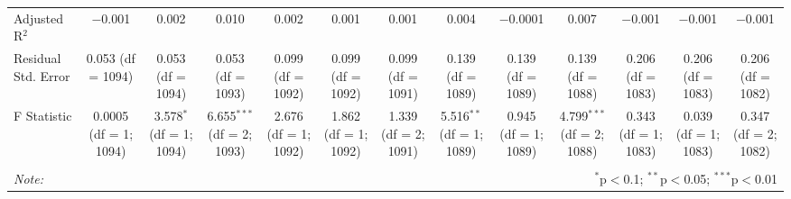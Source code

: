 \begin{table}[!htbp]
\begin{tabular}{@{\extracolsep{5pt}}lcccccccccccc}
Adjusted R$^{2}$ & $-$0.001 & 0.002 & 0.010 & 0.002 & 0.001 & 0.001 & 0.004 & $-$0.0001 & 0.007 & $-$0.001 & $-$0.001 & $-$0.001 \\ 
Residual Std. Error & 0.053 (df = 1094) & 0.053 (df = 1094) & 0.053 (df = 1093) & 0.099 (df = 1092) & 0.099 (df = 1092) & 0.099 (df = 1091) & 0.139 (df = 1089) & 0.139 (df = 1089) & 0.139 (df = 1088) & 0.206 (df = 1083) & 0.206 (df = 1083) & 0.206 (df = 1082) \\ 
F Statistic & 0.0005 (df = 1; 1094) & 3.578$^{*}$ (df = 1; 1094) & 6.655$^{***}$ (df = 2; 1093) & 2.676 (df = 1; 1092) & 1.862 (df = 1; 1092) & 1.339 (df = 2; 1091) & 5.516$^{**}$ (df = 1; 1089) & 0.945 (df = 1; 1089) & 4.799$^{***}$ (df = 2; 1088) & 0.343 (df = 1; 1083) & 0.039 (df = 1; 1083) & 0.347 (df = 2; 1082) \\ 
\hline 
\hline \\[-1.8ex] 
\textit{Note:}  & \multicolumn{12}{r}{$^{*}$p$<$0.1; $^{**}$p$<$0.05; $^{***}$p$<$0.01} \\ 
\end{tabular} 
\end{table} 
